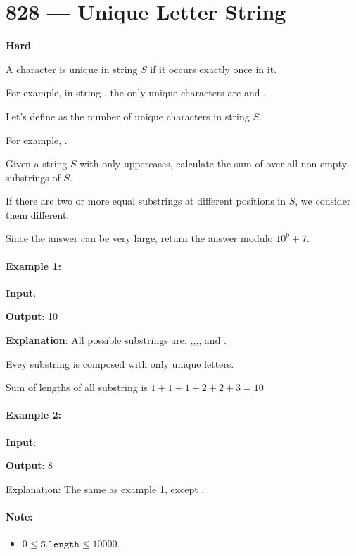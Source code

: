 \section{828 --- Unique Letter String}

\textbf{Hard}

A character is unique in string $S$ if it occurs exactly once in it.

For example, in string , the only unique characters are  and .

Let's define  as the number of unique characters in string $S$.

For example, .

Given a string $S$ with only uppercases, calculate the sum of  over all non-empty substrings of $S$.

If there are two or more equal substrings at different positions in $S$, we consider them different.

Since the answer can be very large, return the answer modulo $10 ^ 9 + 7$.

 

\paragraph{Example 1:}

\begin{flushleft}
\textbf{Input}: 

\textbf{Output}: 10

\textbf{Explanation}: All possible substrings are: ,,,, and .

Evey substring is composed with only unique letters.

Sum of lengths of all substring is $1 + 1 + 1 + 2 + 2 + 3 = 10$
\end{flushleft}

\paragraph{Example 2:}

\begin{flushleft}
\textbf{Input}: 

\textbf{Output}: 8

Explanation: The same as example 1, except .
\end{flushleft}

 

\paragraph{Note:} 

\begin{itemize}
\item $0 \leq \texttt{S.length} \leq 10000$.
\end{itemize}
